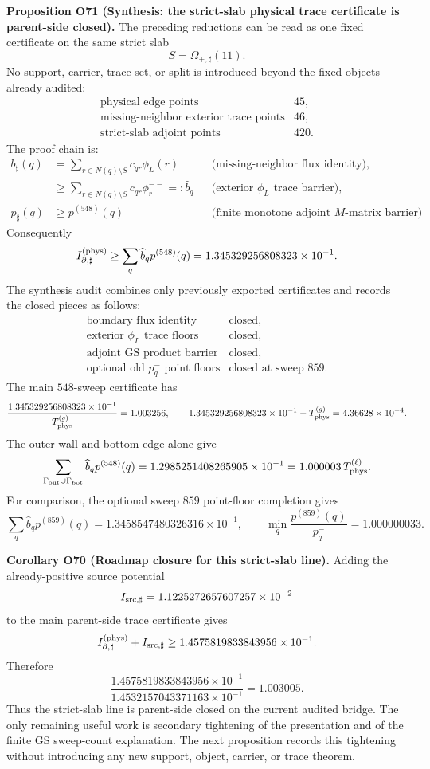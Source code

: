 \documentclass[aps,prd,onecolumn,notitlepage,nofootinbib,superscriptaddress,11pt,floatfix]{revtex4-2}
\begin{document}
\medskip\noindent\textbf{Proposition O71 (Synthesis: the strict-slab physical trace certificate is parent-side closed).}
The preceding reductions can be read as one fixed certificate on the same strict slab
\[
S=\Omega_{+,\sharp}(11).
\]
No support, carrier, trace set, or split is introduced beyond the fixed objects already audited:
\[
\begin{array}{ll}
\text{physical edge points} & 45,\\
\text{missing-neighbor exterior trace points} & 46,\\
\text{strict-slab adjoint points} & 420.
\end{array}
\]
The proof chain is:
\[
\begin{aligned}
b_\sharp(q)
&=
\sum_{r\in N(q)\setminus S}c_{qr}\phi_L(r)
&&\text{(missing-neighbor flux identity)},\\
&\ge
\sum_{r\in N(q)\setminus S}c_{qr}\phi_r^{--}
=:\widehat b_q
&&\text{(exterior \(\phi_L\) trace barrier)},\\
p_\sharp(q)
&\ge p^{(548)}(q)
&&\text{(finite monotone adjoint \(M\)-matrix barrier)}.
\end{aligned}
\]
Consequently
\[
I_{\partial,\sharp}^{(\rm phys)}
\ge
\sum_q\widehat b_qp^{(548)}(q)
=1.345329256808323\times10^{-1}.
\]
The synthesis audit
combines only previously exported certificates and records the closed pieces as follows:
\[
\begin{array}{ll}
\text{boundary flux identity} & \text{closed},\\
\text{exterior \(\phi_L\) trace floors} & \text{closed},\\
\text{adjoint GS product barrier} & \text{closed},\\
\text{optional old \(p_q^-\) point floors} & \text{closed at sweep }859.
\end{array}
\]
The main \(548\)-sweep certificate has
\[
\frac{1.345329256808323\times10^{-1}}{T_{\rm phys}^{(g)}}=1.003256,
\qquad
1.345329256808323\times10^{-1}-T_{\rm phys}^{(g)}
=4.36628\times10^{-4}.
\]
The outer wall and bottom edge alone give
\[
\sum_{\Gamma_{\rm out}\cup\Gamma_{\rm bot}}\widehat b_qp^{(548)}(q)
=1.2985251408265905\times10^{-1}
=1.000003\,T_{\rm phys}^{(\ell)}.
\]
For comparison, the optional sweep \(859\) point-floor completion gives
\[
\sum_q\widehat b_qp^{(859)}(q)
=1.3458547480326316\times10^{-1},
\qquad
\min_q\frac{p^{(859)}(q)}{p_q^-}=1.000000033.
\]

\medskip\noindent\textbf{Corollary O70 (Roadmap closure for this strict-slab line).}
Adding the already-positive source potential
\[
I_{{\rm src},\sharp}=1.1225272657607257\times10^{-2}
\]
to the main parent-side trace certificate gives
\[
I_{\partial,\sharp}^{(\rm phys)}+I_{{\rm src},\sharp}
\ge
1.4575819833843956\times10^{-1}.
\]
Therefore
\[
\frac{
1.4575819833843956\times10^{-1}
}{
1.4532157043371163\times10^{-1}
}
=1.003005.
\]
Thus the strict-slab line is parent-side closed on the current audited bridge.  The only remaining useful work is secondary tightening of the presentation and of the finite GS sweep-count explanation.  The next proposition records this tightening without introducing any new support, object, carrier, or trace theorem.
\end{document}
